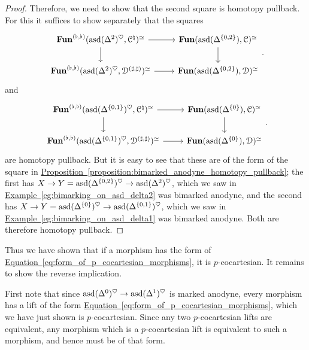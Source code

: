 \documentclass[main.tex]{subfiles}
\begin{document}
\begin{proof}
  Therefore, we need to show that the second square is homotopy pullback. For this it suffices to show separately that the squares
  \begin{equation*}
    \begin{tikzcd}
      \Fun^{(\flat, \flat)}(\asd(\Delta^{2})^{\heartsuit}, \category{C}^{\natural})^{\simeq}
      \arrow[r]
      \arrow[d]
      & \Fun(\asd(\Delta^{\{0, 2\}}), \category{C})^{\simeq}
      \arrow[d]
      \\
      \Fun^{(\flat, \flat)}(\asd(\Delta^{2})^{\heartsuit}, \category{D}^{(\sharp, \sharp)})^{\simeq}
      \arrow[r]
      & \Fun(\asd(\Delta^{\{0, 2\}}), \category{D})^{\simeq}
    \end{tikzcd}.
  \end{equation*}
  and
  \begin{equation*}
    \begin{tikzcd}
      \Fun^{(\flat, \flat)}(\asd(\Delta^{\{0, 1\}})^{\heartsuit}, \category{C}^{\natural})^{\simeq}
      \arrow[r]
      \arrow[d]
      & \Fun(\asd(\Delta^{\{0\}}), \category{C})^{\simeq}
      \arrow[d]
      \\
      \Fun^{(\flat, \flat)}(\asd(\Delta^{\{0, 1\}})^{\heartsuit}, \category{D}^{(\sharp, \sharp)})^{\simeq}
      \arrow[r]
      & \Fun(\asd(\Delta^{\{0\}}), \category{D})^{\simeq}
    \end{tikzcd}.
  \end{equation*}
  are homotopy pullback. But it is easy to see that these are of the form of the square in \hyperref[proposition:bimarked_anodyne_homotopy_pullback]{Proposition~\ref*{proposition:bimarked_anodyne_homotopy_pullback}}; the first has $X \to Y = \mathrm{asd}(\Delta^{\{0, 2\}})^{\heartsuit} \to \mathrm{asd}(\Delta^{2})^{\heartsuit}$, which we saw in \hyperref[eg:bimarking_on_asd_delta2]{Example~\ref*{eg:bimarking_on_asd_delta2}} was bimarked anodyne, and the second has $X \to Y = \mathrm{asd}(\Delta^{\{0\}})^{\heartsuit} \to \mathrm{asd}(\Delta^{\{0, 1\}})^{\heartsuit}$, which we saw in \hyperref[eg:bimarking_on_asd_delta1]{Example~\ref*{eg:bimarking_on_asd_delta1}} was bimarked anodyne. Both are therefore homotopy pullback.
\end{proof}

Thus we have shown that if a morphism has the form of \hyperref[eq:form_of_p_cocartesian_morphisms]{Equation~\ref*{eq:form_of_p_cocartesian_morphisms}}, it is $p$-cocartesian. It remains to show the reverse implication. 

First note that since $\mathrm{asd}(\Delta^{0})^{\heartsuit} \to \mathrm{asd}(\Delta^{1})^{\heartsuit}$ is marked anodyne, every morphism has a lift of the form \hyperref[eq:form_of_p_cocartesian_morphisms]{Equation~\ref*{eq:form_of_p_cocartesian_morphisms}}, which we have just shown is $p$-cocartesian. Since any two $p$-cocartesian lifts are equivalent, any morphism which is a $p$-cocartesian lift is equivalent to such a morphism, and hence must be of that form.
\end{document}
